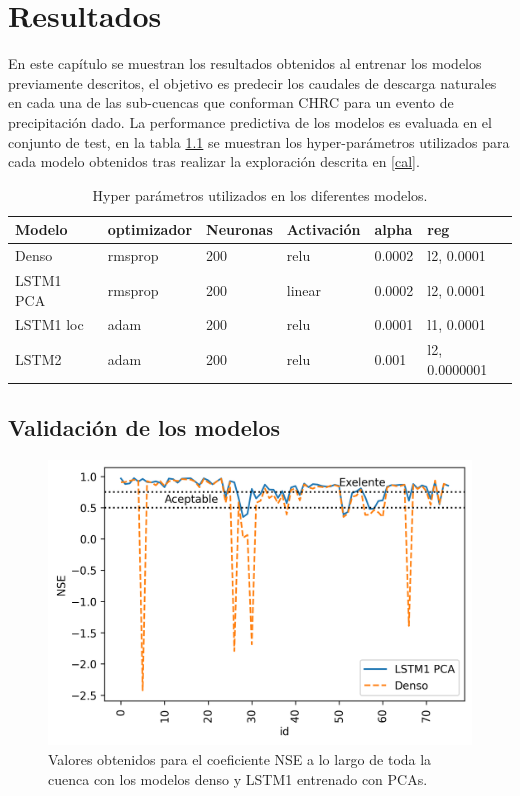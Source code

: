 \chapter{Resultados}
\label{capitulo 3}

En este capítulo se muestran los resultados obtenidos al entrenar los modelos previamente descritos, 
el objetivo es predecir los caudales de descarga naturales en cada una de las sub-cuencas que conforman CHRC para  un evento de 
precipitación dado. 
La performance predictiva de los modelos es evaluada en el conjunto de test, 
en la tabla \ref{hyperres} se muestran los hyper-parámetros utilizados para cada modelo obtenidos
tras realizar la exploración descrita en \ref{cal}.


\begin{table}[]
  \begin{center} 
  \begin{tabular}{|l|l|l|l|l|l|}
    \hline
   Modelo&optimizador &Neuronas & Activación & alpha & reg \\
   \hline
   Denso & rmsprop& 200& relu & 0.0002 &l2, 0.0001  \\
   LSTM1 PCA & rmsprop  &200 & linear &  0.0002  & l2, 0.0001 \\
   LSTM1 loc & adam & 200 & relu & 0.0001 &  l1, 0.0001  \\
   LSTM2 & adam & 200 & relu &  0.001 & l2, 0.0000001 \\
  
   \hline

  \end{tabular}
  \caption{ Hyper parámetros utilizados en los diferentes modelos.}
  \label{hyperres}
\end{center}
  \end{table}

\section{Validación de los modelos}


 \begin{figure}[h!]
   \begin{center}
     \includegraphics[height=3.in]{Figures/NSE/NSEs_LSTM1s_PCA.png}
     \caption{ Valores obtenidos para el coeficiente NSE a lo largo de toda la cuenca con los modelos denso
     y LSTM1 entrenado con PCAs.}
     \label{NSE1}
   \end{center}
 \end{figure}


